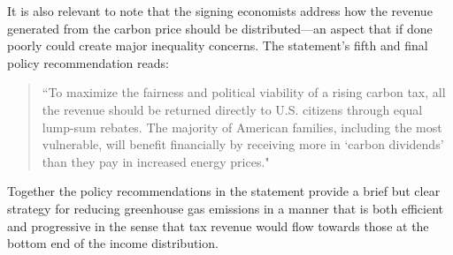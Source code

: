 It is also relevant to note that the signing economists address how the revenue generated from the carbon price should be distributed---an aspect that if done poorly could create major inequality concerns. The statement's fifth and final policy recommendation reads: 
\begin{quote}
    ``To maximize the fairness and political viability of a rising carbon tax, all the revenue should be returned directly to U.S. citizens through equal lump-sum rebates. The majority of American families, including the most vulnerable, will benefit financially by receiving more in `carbon dividends' than they pay in increased energy prices."
\end{quote}
Together the policy recommendations in the statement provide a brief but clear strategy for reducing greenhouse gas emissions in a manner that is both efficient and progressive in the sense that tax revenue would flow towards those at the bottom end of the income distribution. 

